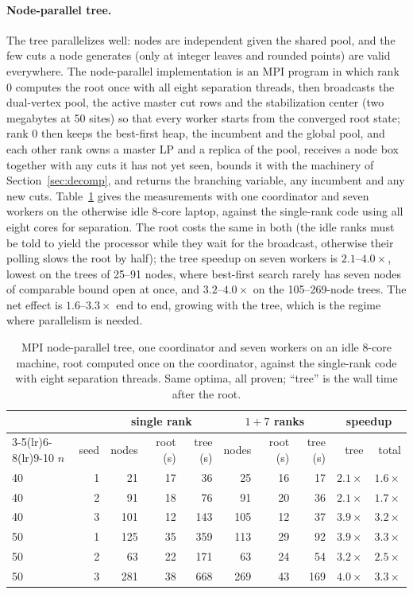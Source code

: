 \documentclass[11pt]{article}
\begin{document}
\paragraph{Node-parallel tree.} The tree parallelizes well: nodes are independent given the shared pool, and the few
cuts a node generates (only at integer leaves and rounded points) are valid everywhere. The node-parallel
implementation is an MPI program in which rank 0 computes the root once with all eight separation threads, then
broadcasts the dual-vertex pool, the active master cut rows and the stabilization center (two megabytes at 50 sites)
so that every worker starts from the converged root state; rank 0 then keeps the best-first heap, the incumbent and
the global pool, and each other rank owns a master LP and a replica of the pool, receives a node box together with any
cuts it has not yet seen, bounds it with the machinery of Section~\ref{sec:decomp}, and returns the branching
variable, any incumbent and any new cuts. Table~\ref{tab:mpi} gives the measurements with one coordinator and seven
workers on the otherwise idle 8-core laptop, against the single-rank code using all eight cores for separation. The
root costs the same in both (the idle ranks must be told to yield the processor while they wait for the broadcast,
otherwise their polling slows the root by half); the tree speedup on seven workers is $2.1$--$4.0\times$, lowest on the
trees of 25--91 nodes, where best-first search rarely has seven nodes of comparable bound open at once, and
$3.2$--$4.0\times$ on the 105--269-node trees. The net effect is $1.6$--$3.3\times$ end to end, growing with the tree,
which is the regime where parallelism is needed.

\begin{table}[ht]
\centering\small
\caption{MPI node-parallel tree, one coordinator and seven workers on an idle 8-core machine, root computed once on
the coordinator, against the single-rank code with eight separation threads. Same optima, all proven; ``tree'' is
the wall time after the root.}
\label{tab:mpi}
\begin{tabular}{lr rrr rrr rr}
\toprule
& & \multicolumn{3}{c}{single rank} & \multicolumn{3}{c}{$1{+}7$ ranks} & \multicolumn{2}{c}{speedup}\\
\cmidrule(lr){3-5}\cmidrule(lr){6-8}\cmidrule(lr){9-10}
$n$ & seed & nodes & root (s) & tree (s) & nodes & root (s) & tree (s) & tree & total\\
\midrule
40 & 1 & 21 & 17 & 36 & 25 & 16 & 17 & $2.1\times$ & $1.6\times$\\
40 & 2 & 91 & 18 & 76 & 91 & 20 & 36 & $2.1\times$ & $1.7\times$\\
40 & 3 & 101 & 12 & 143 & 105 & 12 & 37 & $3.9\times$ & $3.2\times$\\
50 & 1 & 125 & 35 & 359 & 113 & 29 & 92 & $3.9\times$ & $3.3\times$\\
50 & 2 & 63 & 22 & 171 & 63 & 24 & 54 & $3.2\times$ & $2.5\times$\\
50 & 3 & 281 & 38 & 668 & 269 & 43 & 169 & $4.0\times$ & $3.3\times$\\
\bottomrule
\end{tabular}
\end{table}
\end{document}
